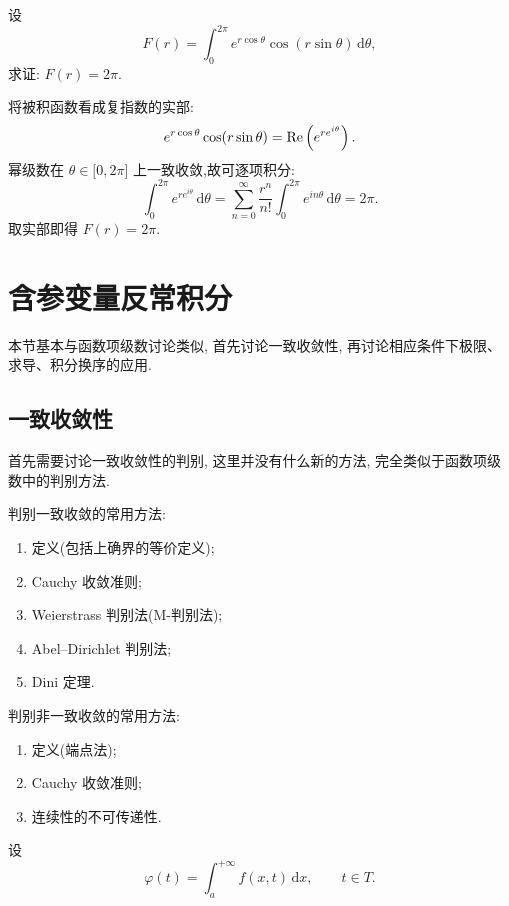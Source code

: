 \begin{example}
    设
    \[
        F(r)=\int_0^{2\pi}e^{r\cos\theta}\cos(r\sin\theta)\,\mathrm{d}\theta,
    \]
    求证: $F(r)=2\pi$.
\end{example}
\exampleblank

\begin{solution}
    将被积函数看成复指数的实部:
    \[
        e^{r\cos\theta}\cos(r\sin\theta)
        =\operatorname{Re}\left(e^{re^{i\theta}}\right).
    \]
    幂级数在 $\theta\in\lbrack0,2\pi\rbrack$ 上一致收敛,故可逐项积分:
    \[
        \int_0^{2\pi}e^{re^{i\theta}}\,\mathrm{d}\theta
        =\sum\limits_{n=0}^{\infty}\dfrac{r^n}{n!}
        \int_0^{2\pi}e^{in\theta}\,\mathrm{d}\theta
        =2\pi.
    \]
    取实部即得 $F(r)=2\pi$.
\end{solution}


\newpage

\section{含参变量反常积分}

本节基本与函数项级数讨论类似, 首先讨论一致收敛性, 再讨论相应条件下极限、求导、积分换序的应用.



\subsection{一致收敛性}

首先需要讨论一致收敛性的判别, 这里并没有什么新的方法, 完全类似于函数项级数中的判别方法.

判别一致收敛的常用方法:
\begin{enumerate}
    \item 定义(包括上确界的等价定义);
    \item Cauchy 收敛准则;
    \item Weierstrass 判别法(M-判别法);
    \item Abel--Dirichlet 判别法;
    \item Dini 定理.
\end{enumerate}

判别非一致收敛的常用方法:
\begin{enumerate}
    \item 定义(端点法);
    \item Cauchy 收敛准则;
    \item 连续性的不可传递性.
\end{enumerate}

设
\[
    \varphi(t)=\int_a^{+\infty}f(x,t)\,\mathrm{d}x,\qquad t\in T.
\]

